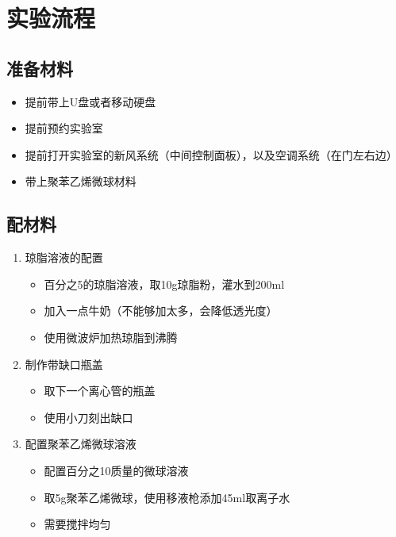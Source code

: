 \documentclass[12pt]{article}
\begin{document}
\section{实验流程}

\subsection{准备材料}
\begin{itemize}
  
    \item 提前带上U盘或者移动硬盘
    \item 提前预约实验室
    \item 提前打开实验室的新风系统（中间控制面板），以及空调系统（在门左右边）
    \item 带上聚苯乙烯微球材料
\end{itemize}
\subsection{配材料}
\begin{enumerate}
    \item 琼脂溶液的配置
    \begin{itemize}
        \item 百分之5的琼脂溶液，取10g琼脂粉，灌水到200ml
        \item 加入一点牛奶（不能够加太多，会降低透光度）
        \item 使用微波炉加热琼脂到沸腾
       

    \end{itemize}
    \item 制作带缺口瓶盖
    \begin{itemize}
        \item 取下一个离心管的瓶盖
        \item 使用小刀刻出缺口
    \end{itemize}

    \item 配置聚苯乙烯微球溶液
    \begin{itemize}
        \item 配置百分之10质量的微球溶液
        \item 取5g聚苯乙烯微球，使用移液枪添加45ml取离子水
        \item 需要搅拌均匀
    \end{itemize}
\end{enumerate}
\end{document}
